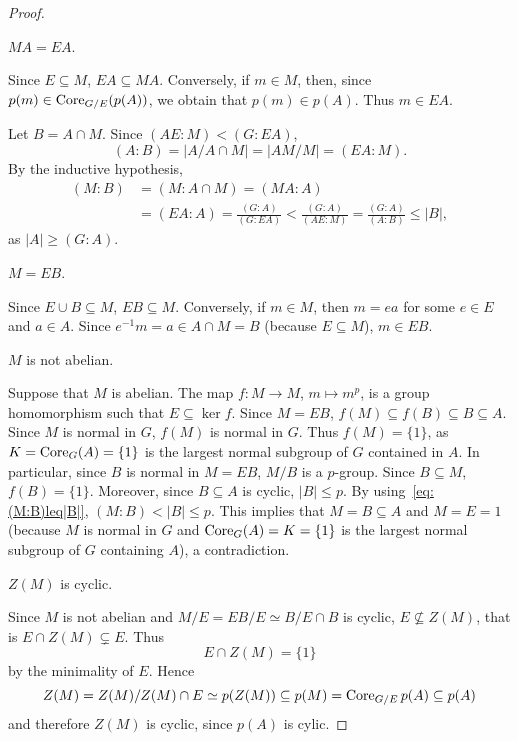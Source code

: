 \begin{proof}
	\begin{claim}
		$MA=EA$. 
	\end{claim}

	Since $E\subseteq M$, $EA\subseteq MA$. Conversely, if $m\in M$, 
	then, since $p(m)\in\operatorname{Core}_{G/E}(p(A))$, we obtain that 
	$p(m)\in p(A)$. Thus $m\in EA$. 

	\medskip
	Let $B=A\cap M$. Since $(AE:M)<(G:EA)$, 
	\[
	(A:B)=|A/A\cap M|=|AM/M|=(EA:M).
	\]
	By the inductive hypothesis, 
	\begin{equation}
		\label{eq:(M:B)leq|B|}
	\begin{aligned}
		(M:B)&=(M:A\cap M)=(MA:A)\\
		&=(EA:A)
		=\frac{(G:A)}{(G:EA)}
		<\frac{(G:A)}{(AE:M)}
		=\frac{(G:A)}{(A:B)}\leq |B|, 
	\end{aligned}
	\end{equation}
	as $|A|\geq (G:A)$. 

	\begin{claim}
		$M=EB$.
	\end{claim}

	Since $E\cup B\subseteq M$, $EB\subseteq M$. Conversely, if 
	$m\in M$, then $m=ea$ for some $e\in E$ and $a\in A$. Since $e^{-1}m=a\in
	A\cap M=B$ (because $E\subseteq M$), $m\in EB$.

	\begin{claim}
		$M$ is not abelian. 
	\end{claim}

	Suppose that $M$ is abelian. The map $f\colon M\to M$, $m\mapsto
	m^p$, is a group homomorphism such that $E \subseteq\ker f$. Since $M=EB$,
	$f(M)\subseteq f(B)\subseteq B\subseteq A$. Since $M$ is normal in $G$,
	$f(M)$ is normal in $G$. Thus $f(M)=\{1\}$, as $K=\operatorname{Core}_G(A)=\{1\}$ is the largest normal subgroup of $G$ contained in $A$. In particular, since $B$ is normal in $M=EB$, $M/B$ is a $p$-group. Since $B\subseteq M$,  $f(B)=\{1\}$. Moreover, since 
	$B\subseteq A$ is cyclic, $|B|\leq p$. By using~\eqref{eq:(M:B)leq|B|}, 
	$(M:B)<|B|\leq p$. This implies that $M=B\subseteq A$ and $M=E=1$ (because 
	$M$ is normal in $G$ and $\operatorname{Core}_G(A)=K=\{1\}$ is the largest normal subgroup of $G$ containing $A$), a contradiction. 
	
	\begin{claim}
		$Z(M)$  is cyclic. 
	\end{claim}

	Since $M$ is not abelian and $M/E=EB/E\simeq B/E\cap B$ is cyclic,
	$E\not\subseteq Z(M)$, that is $E\cap
	Z(M)\subsetneq E$. Thus  
	\begin{equation}
		\label{equation:EcapZ(M)}
		E\cap Z(M)=\{1\}
	\end{equation}
	by the minimality of $E$. Hence  
	\[
	Z(M)=Z(M)/Z(M)\cap E\simeq p(Z(M))\subseteq p(M)=\operatorname{Core}_{G/E}p(A)\subseteq p(A)
	\]
	and therefore $Z(M)$ is cyclic, since $p(A)$ is cylic. 


\end{proof}
